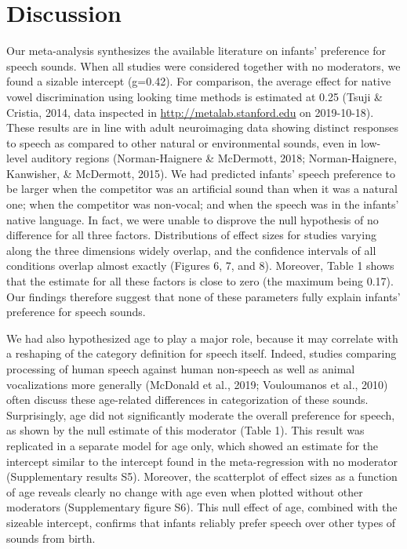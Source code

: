 \documentclass[man]{apa6}
\begin{document}
\section{Discussion}\label{discussion}

Our meta-analysis synthesizes the available literature on infants'
preference for speech sounds. When all studies were considered together
with no moderators, we found a sizable intercept (g=0.42). For
comparison, the average effect for native vowel discrimination using
looking time methods is estimated at 0.25 (Tsuji \& Cristia, 2014, data
inspected in \url{http://metalab.stanford.edu} on 2019-10-18). These
results are in line with adult neuroimaging data showing distinct
responses to speech as compared to other natural or environmental
sounds, even in low-level auditory regions (Norman-Haignere \&
McDermott, 2018; Norman-Haignere, Kanwisher, \& McDermott, 2015). We had
predicted infants' speech preference to be larger when the competitor
was an artificial sound than when it was a natural one; when the
competitor was non-vocal; and when the speech was in the infants' native
language. In fact, we were unable to disprove the null hypothesis of no
difference for all three factors. Distributions of effect sizes for
studies varying along the three dimensions widely overlap, and the
confidence intervals of all conditions overlap almost exactly (Figures
6, 7, and 8). Moreover, Table 1 shows that the estimate for all these
factors is close to zero (the maximum being 0.17). Our findings
therefore suggest that none of these parameters fully explain infants'
preference for speech sounds.

We had also hypothesized age to play a major role, because it may
correlate with a reshaping of the category definition for speech itself.
Indeed, studies comparing processing of human speech against human
non-speech as well as animal vocalizations more generally (McDonald et
al., 2019; Vouloumanos et al., 2010) often discuss these age-related
differences in categorization of these sounds. Surprisingly, age did not
significantly moderate the overall preference for speech, as shown by
the null estimate of this moderator (Table 1). This result was
replicated in a separate model for age only, which showed an estimate
for the intercept similar to the intercept found in the meta-regression
with no moderator (Supplementary results S5). Moreover, the scatterplot
of effect sizes as a function of age reveals clearly no change with age
even when plotted without other moderators (Supplementary figure S6).
This null effect of age, combined with the sizeable intercept, confirms
that infants reliably prefer speech over other types of sounds from
birth.
\end{document}
